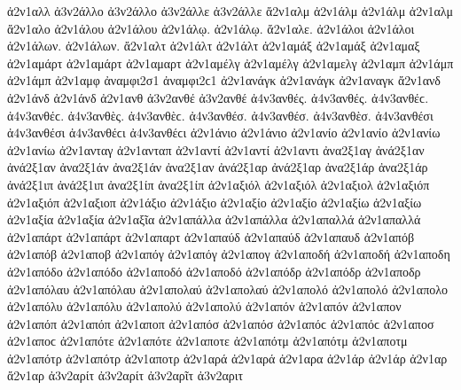{ἀ2ν1αλλ 
ἀ3ν2άλλο ἀ3ν2άλλο   %
ἀ3ν2άλλε ἀ3ν2άλλε 
ἄ2ν1αλμ   %
ἀ2ν1άλμ ἀ2ν1άλμ   %
ἀ2ν1αλμ 
ἄ2ν1αλο   %
ἀ2ν1άλου ἀ2ν1άλου 
ἀ2ν1άλῳ. ἀ2ν1άλῳ. 
ἄ2ν1αλε. 
ἀ2ν1άλοι ἀ2ν1άλοι 
ἀ2ν1άλων. ἀ2ν1άλων. 
ἄ2ν1αλτ   %
ἀ2ν1άλτ ἀ2ν1άλτ 
ἀ2ν1αμάξ ἀ2ν1αμάξ   %
ἀ2ν1αμαξ 
ἀ2ν1αμάρτ ἀ2ν1αμάρτ   %
ἀ2ν1αμαρτ 
ἀ2ν1αμέλγ ἀ2ν1αμέλγ   %
ἀ2ν1αμελγ 
ἀ2ν1αμπ   %
ἀ2ν1άμπ ἀ2ν1άμπ   %
ἀ2ν1αμφ   %
ἀναμφι2σ1 ἀναμφι2ϲ1   %
ἀ2ν1ανάγκ ἀ2ν1ανάγκ   %
ἀ2ν1αναγκ 
ἄ2ν1ανδ   %
ἀ2ν1άνδ ἀ2ν1άνδ 
ἀ2ν1ανθ   %
ἀ3ν2ανθέ ἀ3ν2ανθέ   %
ἀ4ν3ανθές. ἀ4ν3ανθές. ἀ4ν3ανθέϲ. ἀ4ν3ανθέϲ.   %
ἀ4ν3ανθὲς. ἀ4ν3ανθὲϲ. 
ἀ4ν3ανθέσ. ἀ4ν3ανθέσ. 
ἀ4ν3ανθὲσ. 
ἀ4ν3ανθέσι ἀ4ν3ανθέσι ἀ4ν3ανθέϲι ἀ4ν3ανθέϲι 
ἀ2ν1άνιο ἀ2ν1άνιο   %
ἀ2ν1ανίο ἀ2ν1ανίο 
ἀ2ν1ανίω ἀ2ν1ανίω 
ἀ2ν1ανταγ   %
ἀ2ν1ανταπ   %
ἀ2ν1αντί ἀ2ν1αντί   %
ἀ2ν1αντι 
ἀνα2ξ1αγ   %
ἀνά2ξ1αν ἀνά2ξ1αν   %
ἀνα2ξ1άν ἀνα2ξ1άν 
ἀνα2ξ1αν   %
ἀνά2ξ1αρ ἀνά2ξ1αρ   %
ἀνα2ξ1άρ ἀνα2ξ1άρ 
ἀνά2ξ1ιπ ἀνά2ξ1ιπ   %
ἀνα2ξ1ίπ ἀνα2ξ1ίπ 
ἀ2ν1αξιόλ ἀ2ν1αξιόλ   %
ἀ2ν1αξιολ 
ἀ2ν1αξιόπ ἀ2ν1αξιόπ   %
ἀ2ν1αξιοπ 
ἀ2ν1άξιο ἀ2ν1άξιο   %
ἀ2ν1αξίο ἀ2ν1αξίο 
ἀ2ν1αξίω ἀ2ν1αξίω 
ἀ2ν1αξία ἀ2ν1αξία 
ἀ2ν1αξῖα 
ἀ2ν1απάλλα ἀ2ν1απάλλα   %
ἀ2ν1απαλλά ἀ2ν1απαλλά 
ἀ2ν1απάρτ ἀ2ν1απάρτ   %
ἀ2ν1απαρτ 
ἀ2ν1απαύδ ἀ2ν1απαύδ   %
ἀ2ν1απαυδ 
ἀ2ν1απόβ ἀ2ν1απόβ   %
ἀ2ν1αποβ 
ἀ2ν1απόγ ἀ2ν1απόγ   %
ἀ2ν1απογ 
ἀ2ν1αποδή ἀ2ν1αποδή   %
ἀ2ν1αποδη 
ἀ2ν1απόδο ἀ2ν1απόδο   %
ἀ2ν1αποδό ἀ2ν1αποδό 
ἀ2ν1απόδρ ἀ2ν1απόδρ   %
ἀ2ν1αποδρ 
ἀ2ν1απόλαυ ἀ2ν1απόλαυ   %
ἀ2ν1απολαύ ἀ2ν1απολαύ 
ἀ2ν1απολό ἀ2ν1απολό   %
ἀ2ν1απολο 
ἀ2ν1απόλυ ἀ2ν1απόλυ   %
ἀ2ν1απολύ ἀ2ν1απολύ 
ἀ2ν1απόν ἀ2ν1απόν   %
ἀ2ν1απον 
ἀ2ν1απόπ ἀ2ν1απόπ   %
ἀ2ν1αποπ 
ἀ2ν1απόσ ἀ2ν1απόσ ἀ2ν1απόϲ ἀ2ν1απόϲ   %
ἀ2ν1αποσ ἀ2ν1αποϲ 
ἀ2ν1απότε ἀ2ν1απότε   %
ἀ2ν1αποτε 
ἀ2ν1απότμ ἀ2ν1απότμ   %
ἀ2ν1αποτμ 
ἀ2ν1απότρ ἀ2ν1απότρ   %
ἀ2ν1αποτρ 
ἀ2ν1αρά ἀ2ν1αρά   %
ἀ2ν1αρα 
ἀ2ν1άρ ἀ2ν1άρ   %
ἀ2ν1αρ 
ἄ2ν1αρ   %
ἀ3ν2αρίτ ἀ3ν2αρίτ   %
ἀ3ν2αρῖτ   %
ἀ3ν2αριτ   %
}
